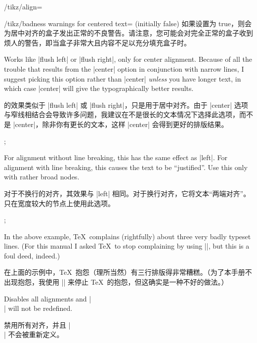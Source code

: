 \begin{key}{/tikz/align=}
\begin{description}
\begin{key}{/tikz/badness warnings for centered text= (initially false)}
                如果设置为 true，则会为居中对齐的盒子发出正常的不良警告。请注意，您可能会对完全正常的盒子收到烦人的警告，即当盒子非常大且内容不足以充分填充盒子时。
            \end{key}
        \item[|align=|\declare{\texttt{flush center}}] Works like |flush left|
            or |flush right|, only for center alignment. Because of all the
            trouble that results from the |center| option in conjunction with
            narrow lines, I suggest picking this option rather than  |center|
            \emph{unless} you have longer text, in which case |center| will
            give the typographically better results.

            的效果类似于 |flush left| 或 |flush right|，只是用于居中对齐。由于 |center| 选项与窄线相结合会导致许多问题，我建议在不是很长的文本情况下选择此选项，而不是 |center|，除非你有更长的文本，这样 |center| 会得到更好的排版结果。
\begin{codeexample}[]
\tikz {};
\end{codeexample}
        \item[|align=|\declare{|justify|}] For alignment without line breaking,
            this has the same effect as |left|. For alignment with line
            breaking, this causes the text to be ``justified''. Use this only
            with rather broad nodes.

            对于不换行的对齐，其效果与 |left| 相同。对于换行对齐，它将文本“两端对齐”。只在宽度较大的节点上使用此选项。
{%
\begin{codeexample}[]
\tikz {};
\end{codeexample}
}
            In the above example, \TeX\ complains (rightfully) about three very
            badly typeset lines. (For this manual I asked \TeX\ to stop
            complaining by using ||, but this is a foul deed,
            indeed.)

            在上面的示例中，\TeX\ 抱怨（理所当然）有三行排版得非常糟糕。（为了本手册不出现抱怨，我使用 || 来停止 \TeX\ 的抱怨，但这确实是一种不好的做法。）

        \item[|align=|\declare{|none|}] Disables all alignments and |\\| will
            not be redefined.

            禁用所有对齐，并且 |\\| 不会被重新定义。
    \end{description}
\end{key}

